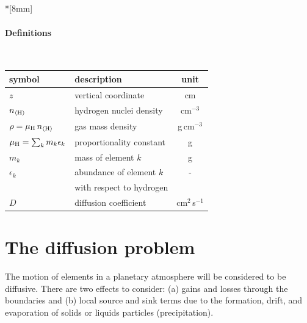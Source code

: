 \documentclass[11pt]{article}
\def\nH{n_{\langle\rm H\rangle}}
\def\ek{\epsilon_k}
\begin{document}
\begin{center}
\\[4mm]
\\[3mm]
\\[3mm]
\\*[8mm]

\paragraph{Definitions}{\ }\\[2mm]

\begin{tabular}{l|l|c}
\hline
symbol  & description & unit\\
\hline
$z$                       & vertical coordinate    & cm\\
$\nH$                     & hydrogen nuclei density & cm$^{-3}$\\
$\rho = \mu_{\rm H}\,\nH$  & gas mass density       & g\,cm$^{-3}$\\
$\mu_{\rm H}=\sum_k m_k\ek$  & proportionality constant & g\\ 
$m_k$                     & mass of element $k$     & g\\
$\ek$                     & abundance of element $k$ & -\\[-1mm]
                          & with respect to hydrogen &\\
$D$                       & diffusion coefficient  & cm$^2$\,s$^{-1}$\\
\hline  
\end{tabular}

\end{center}

\bigskip
\section{The diffusion problem}

The motion of elements in a planetary atmosphere will be considered
to be diffusive. There are two effects to consider: (a) gains and
losses through the boundaries and (b) local source and sink terms due
to the formation, drift, and evaporation of solids or liquids
particles (precipitation). 
\end{document}
